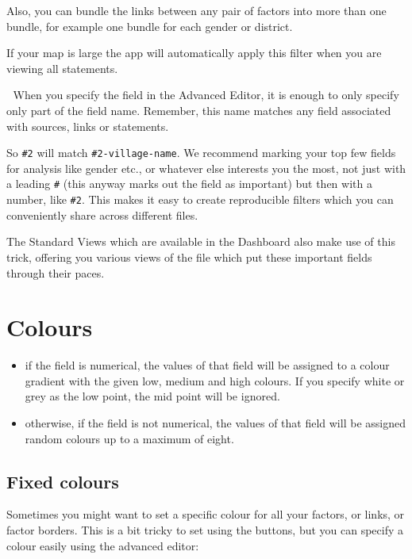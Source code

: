 \documentclass[
]{book}
\providecommand{\tightlist}{%
  \setlength{\itemsep}{0pt}\setlength{\parskip}{0pt}}
\begin{document}
Also, you can bundle the links between any pair of factors into more than one bundle, for example one bundle for each gender or district.

If your map is large the app will automatically apply this filter when you are viewing all statements.

🧪 When you specify the field in the Advanced Editor, it is enough to only specify only part of the field name. Remember, this name matches any field associated with sources, links or statements.

So \texttt{\#2} will match \texttt{\#2-village-name}. We recommend marking your top few fields for analysis like gender etc., or whatever else interests you the most, not just with a leading \texttt{\#} (this anyway marks out the field as important) but then with a number, like \texttt{\#2}. This makes it easy to create reproducible filters which you can conveniently share across different files.

The Standard Views which are available in the Dashboard also make use of this trick, offering you various views of the file which put these important fields through their paces.

\hypertarget{colours}{%
\section{Colours}\label{colours}}

\begin{itemize}
\tightlist
\item
  if the field is numerical, the values of that field will be assigned to a colour gradient with the given low, medium and high colours. If you specify white or grey as the low point, the mid point will be ignored.
\item
  otherwise, if the field is not numerical, the values of that field will be assigned random colours up to a maximum of eight.
\end{itemize}

\hypertarget{xfixed-colours}{%
\subsection{Fixed colours}\label{xfixed-colours}}

Sometimes you might want to set a specific colour for all your factors, or links, or factor borders. This is a bit tricky to set using the buttons, but you can specify a colour easily using the advanced editor:
\end{document}
